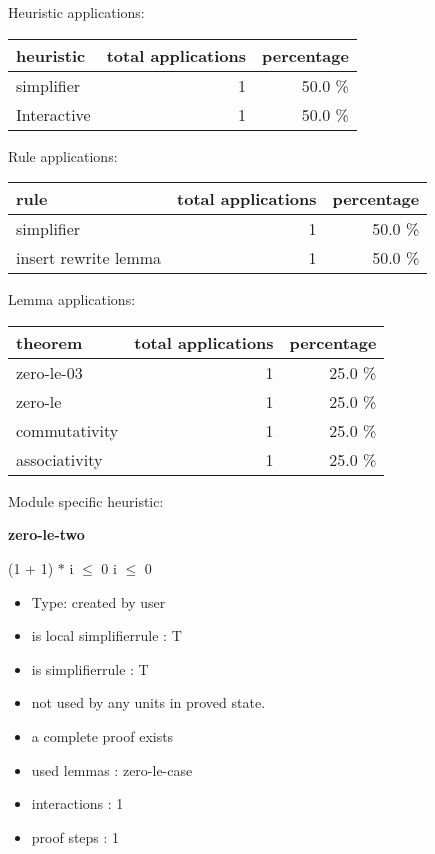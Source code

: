 \documentclass[a4paper]{article}
\begin{document}
\medskip


Heuristic applications:

\begin{supertabular}{l|r|r}
heuristic	& total applications & percentage \\ \hline
simplifier & 1 & 50.0 \% \\
Interactive & 1 & 50.0 \% \\

\end{supertabular}

Rule applications:

\begin{supertabular}{l|r|r}
rule	        & total applications & percentage \\ \hline
simplifier & 1 & 50.0 \% \\
insert rewrite lemma & 1 & 50.0 \% \\

\end{supertabular}

Lemma applications:

\begin{supertabular}{l|r|r}
theorem	        & total applications & percentage \\ \hline
zero-le-03 & 1 & 25.0 \% \\
zero-le & 1 & 25.0 \% \\
commutativity & 1 & 25.0 \% \\
associativity & 1 & 25.0 \% \\

\end{supertabular}

Module specific heuristic:

\pagebreak

{\LARGE\bf zero-le-two}\label{lemma-zero-le-two}

\medskip

 \Fol (1 + 1) $*$ i $\le$ 0 \Equiv i $\le$ 0

\begin{itemize}

\item Type: created by user

\item is local simplifierrule : T
\item is simplifierrule : T
\item not used by any units in proved state.
\item       a complete proof exists
\item       used lemmas  : zero-le-case
\item       interactions : 1
\item       proof steps  : 1
\end{itemize}
\end{document}
